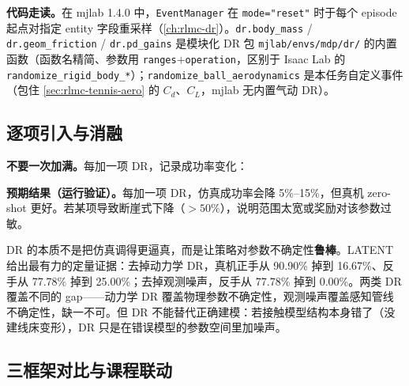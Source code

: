\textbf{代码走读。}在 mjlab 1.4.0 中，\verb|EventManager| 在 \verb|mode="reset"| 时于每个 episode 起点对指定 entity 字段重采样（\cref{ch:rlmc-dr}）。\verb|dr.body_mass| / \verb|dr.geom_friction| / \verb|dr.pd_gains| 是模块化 DR 包 \verb|mjlab/envs/mdp/dr/| 的内置函数（函数名精简、参数用 \verb|ranges|$+$\verb|operation|，区别于 Isaac Lab 的 \verb|randomize_rigid_body_*|）；\verb|randomize_ball_aerodynamics| 是本任务自定义事件（包住 \cref{sec:rlmc-tennis-aero} 的 $C_d$、$C_L$，mjlab 无内置气动 DR）。

\subsection{逐项引入与消融}

\textbf{不要一次加满。}每加一项 DR，记录成功率变化：


\textbf{预期结果（运行验证）。}每加一项 DR，仿真成功率会降 5\%--15\%，但真机 zero-shot 更好。若某项导致断崖式下降（$>50\%$），说明范围太宽或奖励对该参数过敏。

\begin{insight}\label{ins:rlmc-strike-dr-essence}
DR 的本质不是把仿真调得更逼真，而是让策略对参数不确定性\textbf{鲁棒}。LATENT 给出最有力的定量证据：去掉动力学 DR，真机正手从 90.90\% 掉到 16.67\%、反手从 77.78\% 掉到 25.00\%；去掉观测噪声，反手从 77.78\% 掉到 0.00\%。两类 DR 覆盖不同的 gap——动力学 DR 覆盖物理参数不确定性，观测噪声覆盖感知管线不确定性，缺一不可。但 DR 不能替代正确建模：若接触模型结构本身错了（没建线床变形），DR 只是在错误模型的参数空间里加噪声。
\end{insight}

\subsection{三框架对比与课程联动}

